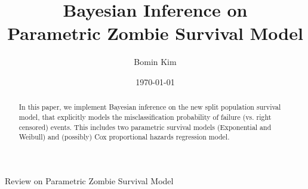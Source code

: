 \documentclass[a4paper, 12pt]{article}
\makeatletter
\renewcommand{\section}{\@startsection
	{section}    {1}    {0mm}    {-0.7\baselineskip}    {0.08\baselineskip}    {\normalfont\large\sc\center\bf}}
\makeatother
\begin{document}
\date{\today }
\title{Bayesian Inference on \\Parametric Zombie Survival Model}
\author{Bomin Kim}
\maketitle
{}
\begin{abstract}
	\noindent In this paper, we implement Bayesian inference on the new split population survival model, that explicitly models the misclassification probability of failure (vs. right censored) events. This includes two parametric survival models (Exponential and Weibull) and (possibly) Cox proportional hazards regression model. 
\end{abstract}
\clearpage \pagebreak \renewcommand{\thefigure}{\arabic{figure}} %
\setcounter{figure}{0} \renewcommand{\thepage}{\arabic{page}} %
\setcounter{page}{1} \pagestyle{plain} \doublespacing
\section{Review on Parametric Zombie Survival Model}
\end{document}

